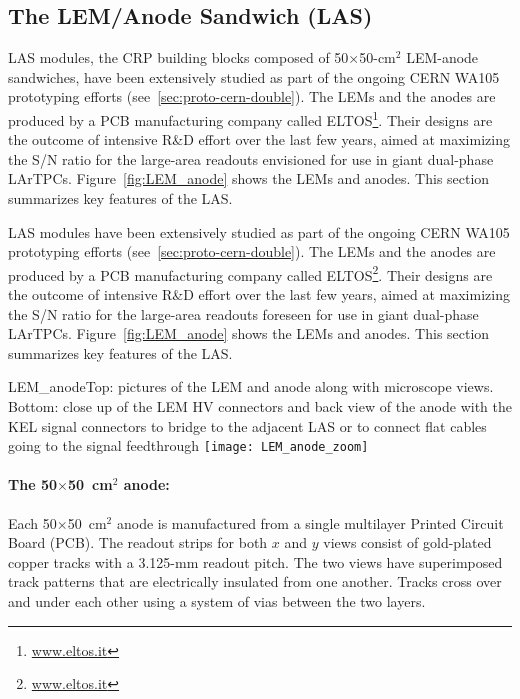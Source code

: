 \subsection{The LEM/Anode Sandwich (LAS)}

LAS modules, the CRP building blocks composed of 50$\times$50-cm$^2$ LEM-anode 
sandwiches,  have been extensively studied as part of the ongoing CERN
WA105 prototyping efforts (see~\ref{sec:proto-cern-double}). The LEMs
and the anodes are produced by a PCB manufacturing company called
ELTOS\footnote{\url{www.eltos.it}}. Their designs are the outcome of
intensive R\&D effort over the last few years, aimed at maximizing the
S/N ratio for the large-area readouts envisioned for use in giant
dual-phase LArTPCs.  Figure~\ref{fig:LEM_anode} shows the LEMs and
anodes.  This section summarizes key features of the LAS.

LAS modules have been extensively studied as part of the ongoing CERN
WA105 prototyping efforts (see~\ref{sec:proto-cern-double}). The LEMs
and the anodes are produced by a PCB manufacturing company called
ELTOS\footnote{\url{www.eltos.it}}. Their designs are the outcome of
intensive R\&D effort over the last few years, aimed at maximizing the
S/N ratio for the large-area readouts foreseen for use in giant
dual-phase LArTPCs.  Figure~\ref{fig:LEM_anode} shows the LEMs and
anodes.  This section summarizes key features of the LAS.
\begin{cdrfigure}
{LEM_anode}{Top: pictures of the LEM and anode along with microscope
  views. Bottom: close up of the LEM HV connectors and back view of the anode 
with the KEL signal connectors to bridge to the adjacent LAS or to connect 
flat cables going to the signal feedthrough}
 \texttt{[image: LEM\_anode\_zoom]}  
 \end{cdrfigure}


 \paragraph{The 50$\times$50~cm$^2$ anode:}

Each  50$\times$50~cm$^2$ anode is manufactured from a single multilayer Printed Circuit
Board (PCB). The readout strips for both $x$ and $y$ views consist of
gold-plated copper tracks %
with a 3.125-mm readout pitch. The two views have superimposed track patterns
that are %
electrically insulated from one another. %
Tracks cross over and under each other using a system of
vias between the two layers.
 
